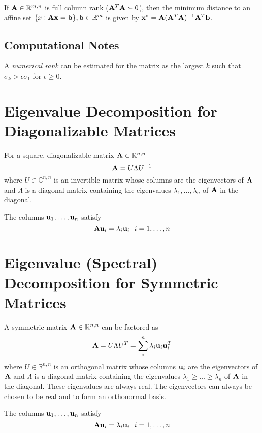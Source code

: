 If $\mathbf{A}\in\mathbb{R}^{m,n}$ is full column rank ($\mathbf{A}^T\mathbf{A}\succ0$), then the minimum distance to an affine set $\{x:\mathbf{A}\mathbf{x}=\mathbf{b}\}, \mathbf{b}\in\mathbb{R}^{m}$ is given by $\mathbf{x}^*=\mathbf{A}(\mathbf{A}^T\mathbf{A})^{-1}\mathbf{A}^T\mathbf{b}$. %


\subsection*{Computational Notes}
A \textit{numerical rank} can be estimated for the matrix as the largest $k$ such that $\sigma_k>\epsilon \sigma_1$ for $\epsilon\ge0$.



\section{Eigenvalue Decomposition for Diagonalizable Matrices}

For a square, diagonalizable matrix $\mathbf{A}\in\mathbb{R}^{n,n}$ 
\begin{equation}
\mathbf{A}=U\Lambda U^{-1}
\end{equation}
where $U\in\mathbb{C}^{n,n}$ is an invertible matrix whose columns are the eigenvectors of $\mathbf{A}$ and $\Lambda$ is a diagonal matrix containing the eigenvalues $\lambda_1,\ldots,\lambda_n$ of $\mathbf{A}$ in the diagonal.

The columns $\mathbf{u}_1,\ldots,\mathbf{u}_n$ satisfy
\begin{equation}
\mathbf{A} \mathbf{u}_i=\lambda_i \mathbf{u}_i~~i=1,\ldots,n
\end{equation}

\section{Eigenvalue (Spectral) Decomposition for Symmetric Matrices}

A symmetric matrix $\mathbf{A}\in\mathbb{R}^{n,n}$ can be factored as
\begin{equation}
\mathbf{A}=U\Lambda U^T=\sum_i^n \lambda_i \mathbf{u}_i \mathbf{u}_i^T
\end{equation}
where $U\in\mathbb{R}^{n,n}$ is an orthogonal matrix whose columns $\mathbf{u}_i$ are the eigenvectors of $\mathbf{A}$ and $\Lambda$ is a diagonal matrix containing the eigenvalues $\lambda_1\ge\ldots\ge\lambda_n$ of $\mathbf{A}$ in the diagonal. These eigenvalues are always real. The eigenvectors can always be chosen to be real and to form an orthonormal basis.

The columns $\mathbf{u}_1,\ldots,\mathbf{u}_n$ satisfy
\begin{equation}
\mathbf{A} \mathbf{u}_i=\lambda_i \mathbf{u}_i~~i=1,\ldots,n
\end{equation}


